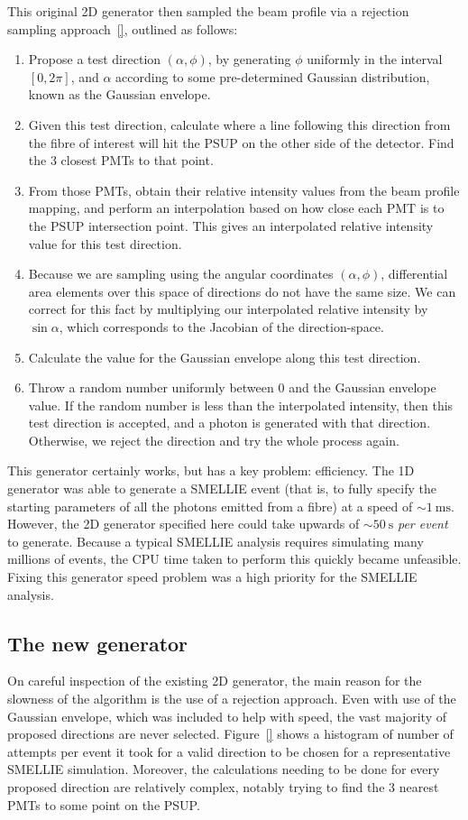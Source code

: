 This original 2D generator then sampled the beam profile via a rejection sampling approach~\ref{}, outlined as follows:
\begin{enumerate}
    \item Propose a test direction $(\alpha, \phi)$, by generating $\phi$ uniformly in the interval $[0, 2\pi]$, and $\alpha$ according to some pre-determined Gaussian distribution, known as the Gaussian envelope.
    \item Given this test direction, calculate where a line following this direction from the fibre of interest will hit the PSUP on the other side of the detector. Find the 3 closest PMTs to that point.
    \item From those PMTs, obtain their relative intensity values from the beam profile mapping, and perform an interpolation based on how close each PMT is to the PSUP intersection point. This gives an interpolated relative intensity value for this test direction.
    \item Because we are sampling using the angular coordinates $(\alpha, \phi)$, differential area elements over this space of directions do not have the same size. We can correct for this fact by multiplying our interpolated relative intensity by $\sin{\alpha}$, which corresponds to the Jacobian of the direction-space.
    \item Calculate the value for the Gaussian envelope along this test direction.
    \item Throw a random number uniformly between 0 and the Gaussian envelope value. If the random number is less than the interpolated intensity, then this test direction is accepted, and a photon is generated with that direction. Otherwise, we reject the direction and try the whole process again.
\end{enumerate}

This generator certainly works, but has a key problem: efficiency. The 1D generator was able to generate a SMELLIE event (that is, to fully specify the starting parameters of all the photons emitted from a fibre) at a speed of $\sim\SI{1}{\milli\second}$. However, the 2D generator specified here could take upwards of $\sim\SI{50}{\second}$ \textit{per event} to generate. Because a typical SMELLIE analysis requires simulating many millions of events, the CPU time taken to perform this quickly became unfeasible. Fixing this generator speed problem was a high priority for the SMELLIE analysis.

\subsection{The new generator}\label{sect:new_gen}
On careful inspection of the existing 2D generator, the main reason for the slowness of the algorithm is the use of a rejection approach. Even with use of the Gaussian envelope, which was included to help with speed, the vast majority of proposed directions are never selected. Figure~\ref{} shows a histogram of number of attempts per event it took for a valid direction to be chosen for a representative SMELLIE simulation. Moreover, the calculations needing to be done for every proposed direction are relatively complex, notably trying to find the 3 nearest PMTs to some point on the PSUP.

